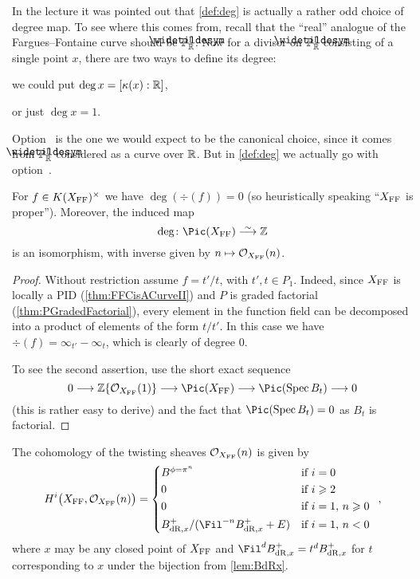 \begin{rem}
	In the lecture it was pointed out that \cref{def:deg} is actually a rather odd choice of degree map. To see where this comes from, recall that the \enquote{real} analogue of the Fargues--Fontaine curve should be $\snake{\IP}_{\IR}^1$. Now for a divisor on $\snake{\IP}_{\IR}^1$ consisting of a single point $x$, there are two ways to define its degree:
	\begin{numerate}
		\item we could put $\deg x=[\kappa(x):\mathbb{R}]$,
		\item or just $\deg x=1$.
	\end{numerate}
	Option~ is the one we would expect to be the canonical choice, since it comes from $\snake{\IP}_{\IR}^1$ considered as a curve over $\mathbb{R}$. But in \cref{def:deg} we actually go with option~.
\end{rem}
\begin{prop}\label{prop:PicX=Z}
	For $f\in K(X_{\mathrm{FF}})^\times$ we have $\deg(\div(f))=0$ (so heuristically speaking \enquote{$X_{\mathrm{FF}}$ is proper}). Moreover, the induced map
	\begin{equation*}
		\deg\colon \Pic(X_\FFC)\isomorphism \IZ
	\end{equation*}
	is an isomorphism, with inverse given by $n\mapsto \mathcal{O}_{X_{\mathrm{FF}}}(n)$.
\end{prop}
\begin{proof}
	Without restriction assume $f=t'/t$, with $t',t\in P_1$. Indeed, since $X_{\mathrm{FF}}$ is locally a PID (\cref{thm:FFCisACurveII}) and $P$ is graded factorial (\cref{thm:PGradedFactorial}), every element in the function field can be decomposed into a product of elements of the form $t/t'$. In this case we have $\div(f)=\infty_{t'}-\infty_t$, which is clearly of degree $0$.
	
	To see the second assertion, use the short exact sequence
	\begin{equation*}
		0\morphism \IZ\{\Oo_{X_\FFC}(1)\}\morphism \Pic(X_\FFC)\morphism \Pic(\Spec B_t)\morphism 0
	\end{equation*}
	(this is rather easy to derive) and the fact that $\Pic(\Spec B_t)=0$ as $B_t$ is factorial.
\end{proof}
\begin{prop}
	The cohomology of the twisting sheaves $\mathcal{O}_{X_{\mathrm{FF}}}(n)$ is given by
	\begin{equation*}
		H^i\big(X_\FFC,\Oo_{X_\FFC}(n)\big)=\begin{cases*}
		B^{\phi=\pi^n} & if $i=0$\\
		0 & if $i\geq 2$\\
		0 & if $i=1$, $n\geq 0$\\
		B_{\dR,x}^+/(\Fil^{-n}B_{\dR,x}^++E) & if $i=1$, $n<0$
		\end{cases*}\,,
	\end{equation*}
	where $x$ may be any closed point of $X_{\mathrm{FF}}$ and $\Fil^dB_{\dR,x}^+=t^dB_{\dR,x}^+$ for $t$ corresponding to $x$ under the bijection from \cref{lem:BdRx}.
\end{prop}
